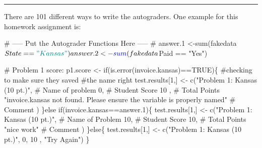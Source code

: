 \documentclass[
]{article}
\newenvironment{Shaded}{}{}
\newcommand{\CommentTok}[1]{\textcolor[rgb]{0.00,0.50,0.00}{#1}}
\newcommand{\ControlFlowTok}[1]{\textcolor[rgb]{0.00,0.00,1.00}{#1}}
\newcommand{\DecValTok}[1]{#1}
\newcommand{\FloatTok}[1]{#1}
\newcommand{\KeywordTok}[1]{\textcolor[rgb]{0.00,0.00,1.00}{#1}}
\newcommand{\NormalTok}[1]{#1}
\newcommand{\OperatorTok}[1]{#1}
\newcommand{\OtherTok}[1]{\textcolor[rgb]{1.00,0.25,0.00}{#1}}
\newcommand{\StringTok}[1]{\textcolor[rgb]{0.00,0.50,0.50}{#1}}
\begin{document}
\begin{center}\rule{0.5\linewidth}{0.5pt}\end{center}

There are 101 different ways to write the autograders. One example for
this homework assignment is:

\hypertarget{numCode}{%
\label{numCode}}%
\begin{Shaded}
\begin{Highlighting}[numbers=left,,]
    \CommentTok{# ----- Put the Autograder Functions Here ----- #}
\NormalTok{    answer}\FloatTok{.1}\NormalTok{ <-}\KeywordTok{sum}\NormalTok{(fakedata}\OperatorTok{$}\NormalTok{State}\OperatorTok{==}\StringTok{"Kansas"}\NormalTok{)}
\NormalTok{    answer}\FloatTok{.2}\NormalTok{ <-}\StringTok{ }\KeywordTok{sum}\NormalTok{(fakedata}\OperatorTok{$}\NormalTok{Paid }\OperatorTok{==}\StringTok{ "Yes"}\NormalTok{)}
    
    \CommentTok{# Problem 1 score:}
\NormalTok{    p1.score <-}\StringTok{ }\ControlFlowTok{if}\NormalTok{(}\KeywordTok{is.error}\NormalTok{(invoice.kansas)}\OperatorTok{==}\OtherTok{TRUE}\NormalTok{)\{ }\CommentTok{#checking to make sure they saved }
    \CommentTok{#the name right}
\NormalTok{        test.results[}\DecValTok{1}\NormalTok{,] <-}\StringTok{ }\KeywordTok{c}\NormalTok{(}\StringTok{"Problem 1: Kansas (10 pt.)"}\NormalTok{, }\CommentTok{# Name of problem}
                              \DecValTok{0}\NormalTok{, }\CommentTok{# Student Score}
                              \DecValTok{10}\NormalTok{ , }\CommentTok{# Total Points}
                              \StringTok{"invoice.kansas not found. }
\StringTok{                              Please ensure the variable is properly named"} \CommentTok{# Comment}
\NormalTok{                              )}
\NormalTok{    \}}\ControlFlowTok{else} \ControlFlowTok{if}\NormalTok{(invoice.kansas}\OperatorTok{==}\NormalTok{answer}\FloatTok{.1}\NormalTok{)\{}
\NormalTok{        test.results[}\DecValTok{1}\NormalTok{,] <-}\StringTok{ }\KeywordTok{c}\NormalTok{(}\StringTok{"Problem 1: Kansas (10 pt.)"}\NormalTok{, }\CommentTok{# Name of Problem}
                              \DecValTok{10}\NormalTok{, }\CommentTok{# Student Score}
                              \DecValTok{10}\NormalTok{, }\CommentTok{# Total Points}
                              \StringTok{"nice work"} \CommentTok{# Comment}
\NormalTok{                              )}
\NormalTok{    \}}\ControlFlowTok{else}\NormalTok{\{}
\NormalTok{        test.results[}\DecValTok{1}\NormalTok{,] <-}\StringTok{ }\KeywordTok{c}\NormalTok{(}\StringTok{"Problem 1: Kansas (10 pt.)"}\NormalTok{,}
                              \DecValTok{0}\NormalTok{,}
                              \DecValTok{10}\NormalTok{ ,}
                              \StringTok{"Try Again"}\NormalTok{)}
\NormalTok{    \}}
    

\end{Highlighting}
\end{Shaded}
\end{document}
